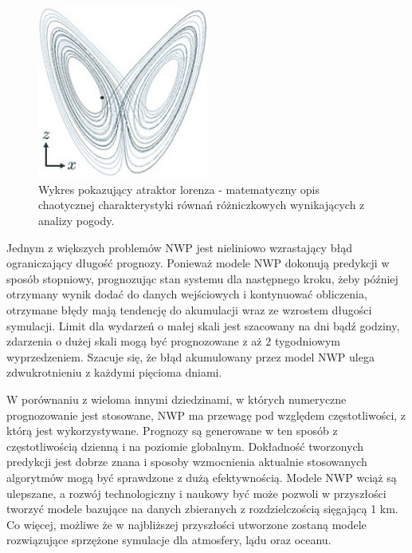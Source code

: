 \begin{figure}[H]
    \centering
    \includegraphics[width=0.5\textwidth]{images/lorenz.jpeg}
    \caption[lorenz]{Wykres pokazujący atraktor lorenza - matematyczny opis chaotycznej 
    charakterystyki równań różniczkowych wynikających z analizy pogody.\footnotemark}
    \label{lorenz}
\end{figure}

Jednym z większych problemów NWP jest nieliniowo wzrastający błąd ograniczający długość prognozy.
Ponieważ modele NWP dokonują predykcji w sposób stopniowy, prognozując stan systemu dla następnego
kroku, żeby później otrzymany wynik dodać do danych wejściowych i kontynuować obliczenia, otrzymane błędy
mają tendencję do akumulacji wraz ze wzrostem długości symulacji.
Limit dla wydarzeń o małej skali jest szacowany na dni bądź godziny, zdarzenia o dużej skali
mogą być prognozowane z aż 2 tygodniowym wyprzedzeniem. Szacuje się, że błąd akumulowany przez 
model NWP ulega zdwukrotnieniu z każdymi pięcioma dniami.

W porównaniu z wieloma innymi dziedzinami, w których numeryczne prognozowanie jest stosowane,
NWP ma przewagę pod względem częstotliwości, z którą jest wykorzystywane. Prognozy są generowane
w ten sposób z częstotliwością dzienną i na poziomie globalnym. Dokładność tworzonych predykcji jest
dobrze znana i sposoby wzmocnienia aktualnie stosowanych algorytmów mogą być sprawdzone z dużą
efektywnością. Modele NWP wciąż są ulepszane, a rozwój technologiczny i naukowy być może pozwoli
w przyszłości tworzyć modele bazujące na danych zbieranych z rozdzielczością sięgającą 1 km. Co więcej,
możliwe że w najbliższej przyszłości utworzone zostaną modele rozwiązujące sprzężone symulacje
dla atmosfery, lądu oraz oceanu\cite{nwp-the-quiet-revolution}.

